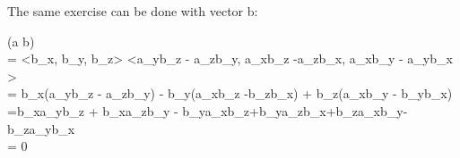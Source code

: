 \documentclass{article}
\begin{document}
\par\noindent The same exercise can be done with vector b:

	\begin{flalign*}
	\cdot(\vec a \times \vec b) \\
	= <b_{x}, b_{y}, b_{z}> \cdot <a_{y}b_{z} - a_{z}b_{y}, a_{x}b_{z} -a_{z}b_{x}, a_{x}b_{y} - a_{y}b_{x} > \\
	= b_{x}(a_{y}b_{z} - a_{z}b_{y}) - b_{y}(a_{x}b_{z} -b_{z}b_{x}) + b_{z}(a_{x}b_{y} - b_{y}b_{x}) \\
	=b_{x}a_{y}b_{z} + b_{x}a_{z}b_{y} - b_{y}a_{x}b_{z}+b_{y}a_{z}b_{x}+b_{z}a_{x}b_{y}-b_{z}a_{y}b_{x}\\
	= 0
\end{flalign*}
\end{document}
